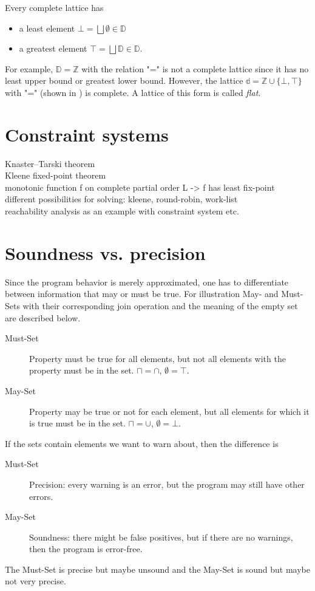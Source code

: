 Every complete lattice has
\begin{itemize}
\item a least element $\bot = \bigsqcup \emptyset \in \mathbb{D}$
\item a greatest element $\top = \bigsqcup \mathbb{D} \in \mathbb{D}$.
\end{itemize}

For example, $\mathbb{D} = \mathbb{Z}$ with the relation "=" is not a complete lattice since it has no least upper bound or greatest lower bound. However, the lattice $\mathbb{d} = \mathbb{Z} \cup \{\bot, \top\}$ with "=" (shown in ) is complete. A lattice of this form is called \textit{flat}.



\section{Constraint systems}
Knaster–Tarski theorem\\
Kleene fixed-point theorem\\
monotonic function f on complete partial order L -> f has least fix-point\\
different possibilities for solving: kleene, round-robin, work-list\\
reachability analysis as an example with constraint system etc.


\section{Soundness vs. precision}
Since the program behavior is merely approximated, one has to differentiate between information that may or must be true. For illustration May- and Must-Sets with their corresponding join operation and the meaning of the empty set are described below.
\begin{description}
\item[Must-Set] Property must be true for all elements, but not all elements with the property must be in the set. $\sqcap = \cap$, $\emptyset = \top$.
\item[May-Set] Property may be true or not for each element, but all elements for which  it is true must be in the set. $\sqcap = \cup$, $\emptyset = \bot$.
\end{description}
If the sets contain elements we want to warn about, then the difference is
\begin{description}
\item[Must-Set] Precision: every warning is an error, but the program may still have other errors.
\item[May-Set] Soundness: there might be false positives, but if there are no warnings, then the program is error-free.
\end{description}
The Must-Set is precise but maybe unsound and the May-Set is sound but maybe not very precise.


